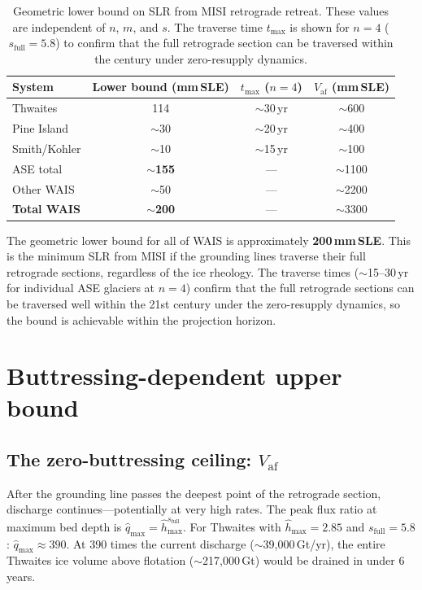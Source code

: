 \documentclass[11pt]{article}
\newcommand{\hhat}{\hat{h}}
\newcommand{\Vaf}{V_{\mathrm{af}}}
\begin{document}
\begin{table}[ht]
\centering
\caption{Geometric lower bound on SLR from MISI retrograde retreat. These values are independent of $n$, $m$, and $s$. The traverse time $t_{\max}$ is shown for $n = 4$ ($s_{\mathrm{full}} = 5.8$) to confirm that the full retrograde section can be traversed within the century under zero-resupply dynamics.}
\label{tab:lower_bounds}
\smallskip
\begin{tabular}{l c c c}
\toprule
System & Lower bound (mm\,SLE) & $t_{\max}$ ($n{=}4$) & $\Vaf$ (mm\,SLE) \\
\midrule
Thwaites & 114 & $\sim$30\,yr & $\sim$600 \\
Pine Island & $\sim$30 & $\sim$20\,yr & $\sim$400 \\
Smith/Kohler & $\sim$10 & $\sim$15\,yr & $\sim$100 \\
\midrule
ASE total & $\sim$\textbf{155} & --- & $\sim$1100 \\
Other WAIS & $\sim$50 & --- & $\sim$2200 \\
\midrule
\textbf{Total WAIS} & $\sim$\textbf{200} & --- & $\sim$3300 \\
\bottomrule
\end{tabular}
\end{table}

The geometric lower bound for all of WAIS is approximately \textbf{200\,mm\,SLE}. This is the minimum SLR from MISI if the grounding lines traverse their full retrograde sections, regardless of the ice rheology. The traverse times ($\sim$15--30\,yr for individual ASE glaciers at $n = 4$) confirm that the full retrograde sections can be traversed well within the 21st century under the zero-resupply dynamics, so the bound is achievable within the projection horizon.


\section{Buttressing-dependent upper bound}
\label{sec:upper_bound}

\subsection{The zero-buttressing ceiling: $\Vaf$}

After the grounding line passes the deepest point of the retrograde section, discharge continues---potentially at very high rates. The peak flux ratio at maximum bed depth is $\hat{q}_{\max} = \hhat_{\max}^{s_{\mathrm{full}}}$. For Thwaites with $\hhat_{\max} = 2.85$ and $s_{\mathrm{full}} = 5.8$: $\hat{q}_{\max} \approx 390$. At 390 times the current discharge ($\sim$39{,}000\,Gt/yr), the entire Thwaites ice volume above flotation ($\sim$217{,}000\,Gt) would be drained in under 6 years.
\end{document}
